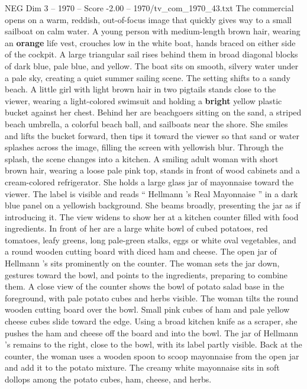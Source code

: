 \begin{textsample}{NEG Dim 3 – 1970 – Score -2.00 – 1970/tv\_com\_1970\_43.txt}  \label{ex:f3_neg_065}
The commercial opens on a warm, reddish, out-of-focus image that quickly gives way to a small sailboat on calm water.
A young person with medium-length brown hair, wearing an \textbf{orange} life vest, crouches low in the white boat, hands braced on either side of the cockpit.
A large triangular sail rises behind them in broad diagonal blocks of dark blue, pale blue, and yellow.
The boat sits on smooth, silvery water under a pale sky, creating a quiet summer sailing scene.
The setting shifts to a sandy beach.
A little girl with light brown hair in two pigtails stands close to the viewer, wearing a light-colored swimsuit and holding a \textbf{bright} yellow plastic bucket against her chest.
Behind her are beachgoers sitting on the sand, a striped beach umbrella, a colorful beach ball, and sailboats near the shore.
She smiles and lifts the bucket forward, then tips it toward the viewer so that sand or water splashes across the image, filling the screen with yellowish blur.
Through the splash, the scene changes into a kitchen.
A smiling adult woman with short brown hair, wearing a loose pale pink top, stands in front of wood cabinets and a cream-colored refrigerator.
She holds a large glass jar of mayonnaise toward the viewer.
The label is visible and reads “ Hellmann ’s Real Mayonnaise ” in a dark blue panel on a yellowish background.
She beams broadly, presenting the jar as if introducing it.
The view widens to show her at a kitchen counter filled with food ingredients.
In front of her are a large white bowl of cubed potatoes, red tomatoes, leafy greens, long pale-green stalks, eggs or white oval vegetables, and a round wooden cutting board with diced ham and cheese.
The open jar of Hellmann ’s sits prominently on the counter.
The woman sets the jar down, gestures toward the bowl, and points to the ingredients, preparing to combine them.
A close view of the counter shows the bowl of potato salad base in the foreground, with pale potato cubes and herbs visible.
The woman tilts the round wooden cutting board over the bowl.
Small pink cubes of ham and pale yellow cheese cubes slide toward the edge.
Using a broad kitchen knife as a scraper, she pushes the ham and cheese off the board and into the bowl.
The jar of Hellmann ’s remains to the right, close to the bowl, with its label partly visible.
Back at the counter, the woman uses a wooden spoon to scoop mayonnaise from the open jar and add it to the potato mixture.
The creamy white mayonnaise sits in soft dollops among the potato cubes, ham, cheese, and herbs.

\end{textsample}
